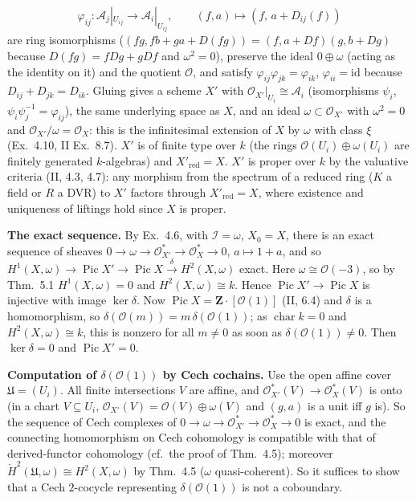 \documentclass[11pt]{article}
\begin{document}
\[
\varphi_{ij}\colon\mathcal A_j|_{U_{ij}}\to\mathcal A_i|_{U_{ij}},\qquad(f,a)\mapsto(f,\,a+D_{ij}(f))
\]
are ring isomorphisms ($(fg,fb+ga+D(fg))=(f,a+Df)(g,b+Dg)$ because $D(fg)=fDg+gDf$ and $\omega^2=0$), preserve the ideal $0\oplus\omega$ (acting as the identity on it) and the quotient $\mathcal O$, and satisfy $\varphi_{ij}\varphi_{jk}=\varphi_{ik}$, $\varphi_{ii}=\mathrm{id}$ because $D_{ij}+D_{jk}=D_{ik}$. Gluing gives a scheme $X'$ with $\mathcal O_{X'}|_{U_i}\cong\mathcal A_i$ (isomorphisms $\psi_i$, $\psi_i\psi_j^{-1}=\varphi_{ij}$), the same underlying space as $X$, and an ideal $\omega\subset\mathcal O_{X'}$ with $\omega^2=0$ and $\mathcal O_{X'}/\omega=\mathcal O_X$: this is the infinitesimal extension of $X$ by $\omega$ with class $\xi$ (Ex.~4.10, II Ex.~8.7). $X'$ is of finite type over $k$ (the rings $\mathcal O(U_i)\oplus\omega(U_i)$ are finitely generated $k$-algebras) and $X'_{\mathrm{red}}=X$. $X'$ is proper over $k$ by the valuative criteria (II, 4.3, 4.7): any morphism from the spectrum of a reduced ring ($K$ a field or $R$ a DVR) to $X'$ factors through $X'_{\mathrm{red}}=X$, where existence and uniqueness of liftings hold since $X$ is proper.

\textbf{The exact sequence.} By Ex.~4.6, with $\mathcal I=\omega$, $X_0=X$, there is an exact sequence of sheaves $0\to\omega\to\mathcal O_{X'}^*\to\mathcal O_X^*\to0$, $a\mapsto1+a$, and so $H^1(X,\omega)\to\operatorname{Pic}X'\to\operatorname{Pic}X\xrightarrow{\delta}H^2(X,\omega)$ exact. Here $\omega\cong\mathcal O(-3)$, so by Thm.~5.1 $H^1(X,\omega)=0$ and $H^2(X,\omega)\cong k$. Hence $\operatorname{Pic}X'\to\operatorname{Pic}X$ is injective with image $\ker\delta$. Now $\operatorname{Pic}X=\mathbf Z\cdot[\mathcal O(1)]$ (II, 6.4) and $\delta$ is a homomorphism, so $\delta(\mathcal O(m))=m\,\delta(\mathcal O(1))$; as $\operatorname{char}k=0$ and $H^2(X,\omega)\cong k$, this is nonzero for all $m\ne0$ as soon as $\delta(\mathcal O(1))\ne0$. Then $\ker\delta=0$ and $\operatorname{Pic}X'=0$.

\textbf{Computation of $\delta(\mathcal O(1))$ by Cech cochains.} Use the open affine cover $\mathfrak U=(U_i)$. All finite intersections $V$ are affine, and $\mathcal O_{X'}^*(V)\to\mathcal O_X^*(V)$ is onto (in a chart $V\subseteq U_i$, $\mathcal O_{X'}(V)=\mathcal O(V)\oplus\omega(V)$ and $(g,a)$ is a unit iff $g$ is). So the sequence of Cech complexes of $0\to\omega\to\mathcal O_{X'}^*\to\mathcal O_X^*\to0$ is exact, and the connecting homomorphism on Cech cohomology is compatible with that of derived-functor cohomology (cf.\ the proof of Thm.~4.5); moreover $\check H^2(\mathfrak U,\omega)\cong H^2(X,\omega)$ by Thm.~4.5 ($\omega$ quasi-coherent). So it suffices to show that a Cech $2$-cocycle representing $\delta(\mathcal O(1))$ is not a coboundary.
\end{document}
